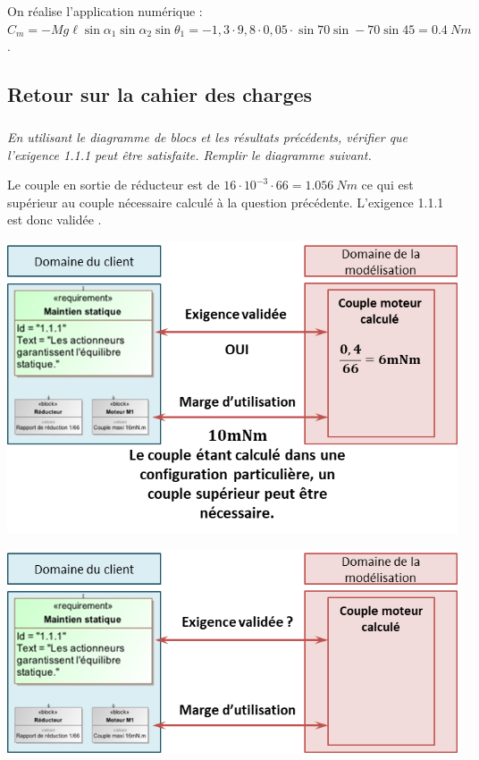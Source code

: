 \documentclass[10pt,fleqn]{article} %
\begin{document}
\begin{multicols}{2}
\begin{corrige}
\item On réalise l'application numérique : $C_m=-Mg\ell\sin\alpha_1\sin\alpha_2\sin\theta_1 =-1,3\cdot 9,8 \cdot 0,05 \cdot \sin  70 \sin -70 \sin 45 = \SI{0,4}{Nm}$.
\end{corrige}
\else\fi

\subsection*{Retour sur la cahier des charges}

\subparagraph{}
\textit{En utilisant le diagramme de blocs et les résultats précédents, vérifier que l'exigence 1.1.1 peut être satisfaite. Remplir le diagramme suivant.}

\ifprof
\begin{corrige}
Le couple en sortie de réducteur est de $16\cdot 10^{-3} \cdot 66 = \SI{1,056}{Nm}$ ce qui est supérieur au couple nécessaire calculé à la question précédente. L'exigence 1.1.1 est donc validée .
\begin{center}
\includegraphics[width=.5\linewidth]{images/cor_02}
\end{center}

\end{corrige}
\else
\fi

\ifprof
\else

\begin{center}
\includegraphics[width=\linewidth]{images/fig_06}
\end{center}
\fi



\end{multicols}
\end{document}
